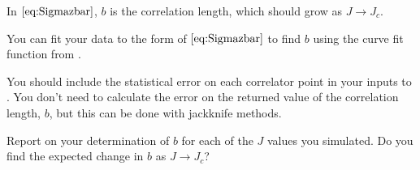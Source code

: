 In \(\eqref{eq:Sigmazbar}\), \(b\) is the correlation length, which should grow as
\(J \rightarrow J_c\).

\Question{} You can fit your data to the form of \(\eqref{eq:Sigmazbar}\) to find \(b\)
using the curve fit function  from
\href{https://github.com/JuliaNLSolvers/LsqFit.jl}{}.

You should include the statistical error on each correlator point in your inputs to
.
You don't need to calculate the error on the returned value of the correlation length,
\(b\), but this can be done with jackknife methods.


\Question{} Report on your determination of \(b\) for each of the \(J\) values you
simulated. Do you find the expected change in \(b\) as \(J \rightarrow J_c\)?
